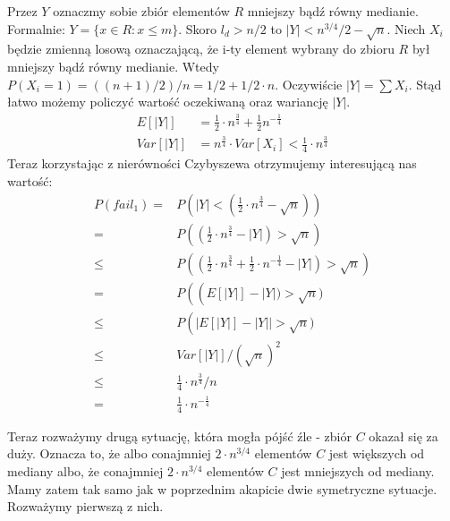 Przez $Y$ oznaczmy sobie zbiór elementów $R$ mniejszy bądź równy medianie.
Formalnie: $Y = \{ x \in R: x \leq m\}$.
Skoro $l_d> n/2$ to $|Y| < n^{3/4}/2 - \sqrt{n}$.
Niech $X_i$ będzie zmienną losową oznaczającą, że i-ty element wybrany do zbioru $R$ był mniejszy bądź równy medianie.
Wtedy $P(X_i = 1) = ((n+1)/2)/n = 1/2 + 1/2\cdot n$.
Oczywiście $|Y| = \sum X_i$.
Stąd łatwo możemy policzyć wartość oczekiwaną oraz wariancję $|Y|$.
\begin{align*} 
 E[|Y|] & = \frac{1}{2} \cdot n^{\frac{3}{4}} + \frac{1}{2}n^{-\frac{1}{4}} \\
 Var[|Y|] & = n^{\frac{3}{4}} \cdot Var[X_i] < \frac{1}{4} \cdot n^{\frac{3}{4}}
\end{align*}
Teraz korzystając z nierówności Czybyszewa otrzymujemy interesującą nas wartość:
\begin{align*}
 P\left(fail_1\right) = & P\left(|Y| < \left(\frac{1}{2} \cdot n^{\frac{3}{4}} - \sqrt{n}\right)\right) \\
                      = & P\left(\left(\frac{1}{2} \cdot n^{\frac{3}{4}} - |Y|\right) > \sqrt{n}\right) \\
                      \leq & P\left(\left(\frac{1}{2} \cdot n^{\frac{3}{4}} + \frac{1}{2} \cdot n^{-\frac{1}{4}} - |Y|\right) > \sqrt{n}\right) \\
                      = & P\left(\left(E[|Y|] - |Y|) > \sqrt{n})\\
                      \leq & P\left(|E[|Y|] -|Y| | > \sqrt{n}) \\
                      \leq & Var[|Y|] / (\sqrt{n})^2 \\
                      \leq & \frac{1}{4} \cdot n^{\frac{3}{4}} / n \\
                      = & \frac{1}{4} \cdot n^{-\frac{1}{4}}
\end{align*}

Teraz rozważymy drugą sytuację, która mogła pójść źle - zbiór $C$ okazał się za duży.
Oznacza to, że albo conajmniej $2 \cdot n^{3/4}$ elementów $C$ jest większych od mediany albo, że conajmniej $2 \cdot n^{3/4}$ elementów $C$ jest mniejszych od mediany.
Mamy zatem tak samo jak w poprzednim akapicie dwie symetryczne sytuacje.
Rozważymy pierwszą z nich.

